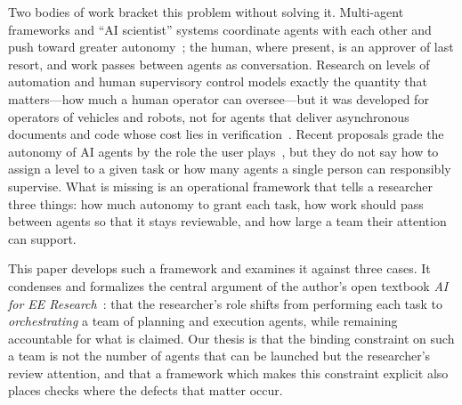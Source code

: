Two bodies of work bracket this problem without solving it. Multi-agent frameworks and
``AI scientist'' systems coordinate agents with each other and push toward greater
autonomy~\cite{wu2023autogen,hong2023metagpt,qian2024chatdev,lu2024aiscientist,schmidgall2025agentlab};
the human, where present, is an approver of last resort, and work passes between agents
as conversation. Research on levels of automation and human supervisory control models
exactly the quantity that matters---how much a human operator can oversee---but it was
developed for operators of vehicles and robots, not for agents that deliver asynchronous
documents and code whose cost lies in
verification~\cite{sheridan1978human,parasuraman2000model,crandall2005validating,cummings2008predicting}.
Recent proposals grade the autonomy of AI agents by the role the user
plays~\cite{feng2025levels}, but they do not say how to assign a level to a given task or
how many agents a single person can responsibly supervise. What is missing is an
operational framework that tells a researcher three things: how much autonomy to grant
each task, how work should pass between agents so that it stays reviewable, and how
large a team their attention can support.

This paper develops such a framework and examines it against three cases. It condenses
and formalizes the central argument of the author's open textbook \textit{AI for EE
Research}~\cite{mccreary2026aiforee}: that the researcher's role shifts from performing
each task to \textit{orchestrating} a team of planning and execution agents, while
remaining accountable for what is claimed. Our thesis is that the binding constraint on
such a team is not the number of agents that can be launched but the researcher's review
attention, and that a framework which makes this constraint explicit also places checks
where the defects that matter occur.

